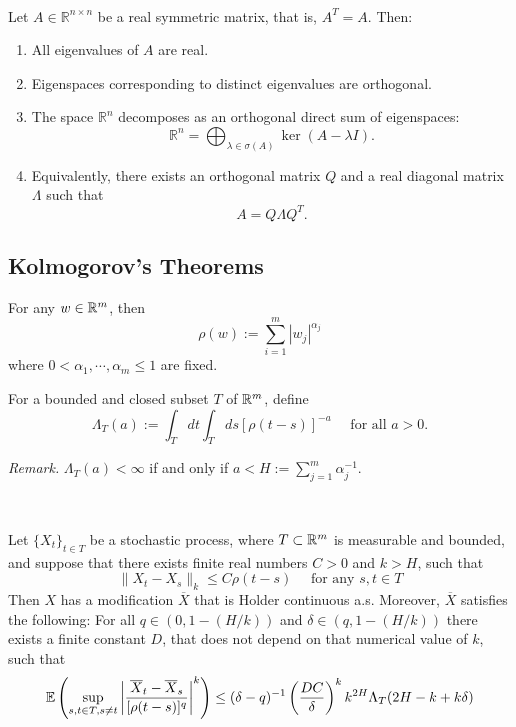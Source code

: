 \begin{theorem}\ \par
Let $A \in \mathbb{R}^{n\times n}$ be a real symmetric matrix, that is, $A^T = A$. Then:

\begin{enumerate}
\item All eigenvalues of $A$ are real.
\item Eigenspaces corresponding to distinct eigenvalues are orthogonal.
\item The space $\mathbb{R}^n$ decomposes as an orthogonal direct sum of eigenspaces:
\[
\mathbb{R}^n = \bigoplus_{\lambda \in \sigma(A)} \ker(A - \lambda I).
\]
\item Equivalently, there exists an orthogonal matrix $Q$ and a real diagonal matrix $\Lambda$ such that
\[
A = Q \Lambda Q^T.
\]
\end{enumerate}
\end{theorem}

\subsection{Kolmogorov's Theorems}

\begin{definition}
    For any $w\in\mathbb{R}^m$, then
    \[\rho(w):=\sum\limits_{i=1}^m |w_j|^{\alpha_j}\]
    where $0 < \alpha_1,\cdots,\alpha_m \leq 1$ are fixed.\par
    For a bounded and closed subset $T$ of $\mathbb{R}^m$, define
    \[
    \Lambda_T(a):= \int_T dt\int_T ds[\rho(t-s)]^{-a}\quad\text{ for all }a>0.
    \]
\end{definition}
\emph{Remark. }$\Lambda_T(a) <\infty$ if and only if $a< H:= \sum\limits_{j=1}^m \alpha_j^{-1}$.

\begin{theorem}\ \par
    Let $\{X_t\}_{t\in T}$ be a stochastic process, where $T\subset \mathbb{R}^m$ is measurable and bounded, and suppose that there exists finite real numbers $C>0$ and $k>H$, such that
    \[\lVert X_t - X_s\rVert_k \leq C\rho(t-s)\quad\text{ for any }s,t\in T\]
    Then $X$ has a modification $\overline{X}$ that is Holder continuous a.s. Moreover, $\overline{X}$ satisfies the following: For all $q\in (0,1-(H/k))$ and $\delta \in (q,1-(H/k))$ there exists a finite constant $D$, that does not depend on that numerical value of $k$, such that
    \[
    \mathbb{E}\left(\sup_{s,t\in T,s\neq t}\left|\dfrac{\overline{X}_t-\overline{X}_s}{[\rho(t-s)]^q}\right|^k \right) \leq (\delta -q)^{-1}\left(\dfrac{DC}{\delta}\right)^k k^{2H}\Lambda_T(2H-k+k\delta)
    \]
\end{theorem}

